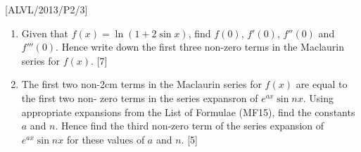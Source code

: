 \item {[}ALVL/2013/P2/3{]}
\begin{enumerate}
\item Given that $f\left(x\right)=\ln\left(1+2\sin x\right)$, find $f\left(0\right)$,
$f'\left(0\right)$, $f''\left(0\right)$ and $f'''\left(0\right)$.
Hence write down the first three non-zero terms in the Maclaurin series
for $f\left(x\right)$. \hfill{}{[}7{]}
\item The first two non-2cm terms in the Maclaurin series for $f\left(x\right)$
are equal to the first two non- zero terms in the series expansron
of $e^{ax}\sin nx$. Using appropriate expansions from the List of
Formulae (MF15), find the constants $a$ and $n$. Hence find the
third non-zero term of the series expansion of $e^{ax}\sin nx$ for
these values of $a$ and $n$. \hfill{} {[}5{]}
\end{enumerate}
